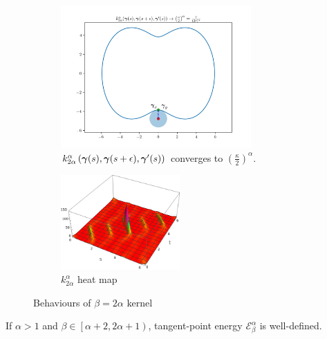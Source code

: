 \documentclass[../dissertation.tex]{subfiles}
\begin{document}
\begin{figure}[tbp]
    \centering
    \begin{subfigure}[b]{\textwidth}
        \centering
        \includegraphics[width=0.8\textwidth]{sections/tangentPointEnergyImgs/perturbed}
        \caption{$k_{2\alpha}^{\alpha} \left( \boldsymbol{\gamma}(s), \boldsymbol{\gamma}(s+\epsilon), \boldsymbol{\gamma}'(s) \right)$ converges to $\left( \frac{\kappa}{2} \right)^{\alpha}$.}
        \label{fig: Buck-Orloff Perturbed}
    \end{subfigure}
    \par \bigskip
    \begin{subfigure}[b]{1\textwidth}
        \centering
        \includegraphics[width=0.5\textwidth]{sections/tangentPointEnergyImgs/kHeatMap1}
        \caption{$k_{2\alpha}^{\alpha}$ heat map}
        \label{fig: Buck-Orloff Heat Map}
    \end{subfigure}
    \caption{Behaviours of $\beta = 2\alpha$ kernel}
\end{figure}

\begin{corollary}
    If $\alpha > 1$ and $\beta \in \left[ \alpha + 2, 2\alpha + 1 \right)$, tangent-point energy $\mathcal{E}_{\beta}^{\alpha}$ is well-defined.
\end{corollary}
\end{document}
